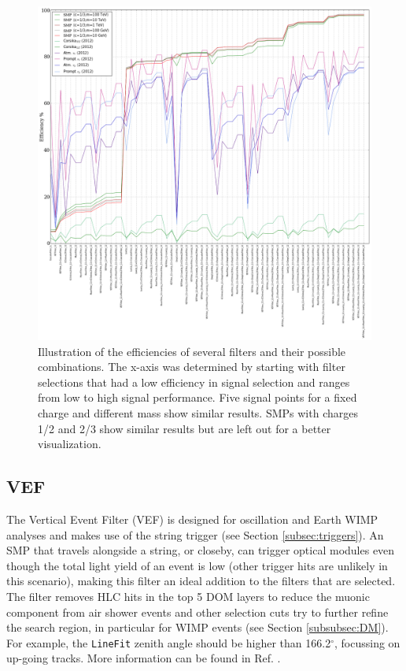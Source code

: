 \begin{figure}
\centering
\includegraphics[width=\textwidth]{chapter8/img/FilterRate_better.png}
\caption{Illustration of the efficiencies of several filters and their possible combinations. The x-axis was determined by starting with filter selections that had a low efficiency in signal selection and ranges from low to high signal performance. Five signal points for a fixed charge and different mass show similar results. SMPs with charges 1/2 and 2/3 show similar results but are left out for a better visualization.}
\label{fig:filterrate}
\end{figure}

\subsection{VEF}
The Vertical Event Filter (VEF) is designed for oscillation and Earth WIMP analyses and makes use of the string trigger (see Section \ref{subsec:triggers}). An SMP that travels alongside a string, or closeby, can trigger optical modules even though the total light yield of an event is low (other trigger hits are unlikely in this scenario), making this filter an ideal addition to the filters that are selected. The filter removes HLC hits in the top 5 DOM layers to reduce the muonic component from air shower events and other selection cuts try to further refine the search region, in particular for WIMP events (see Section \ref{subsubsec:DM}). For example, the \texttt{LineFit} zenith angle should be higher than 166.2$^\circ$, focussing on up-going tracks. More information can be found in Ref. \cite{VEF2012}.

